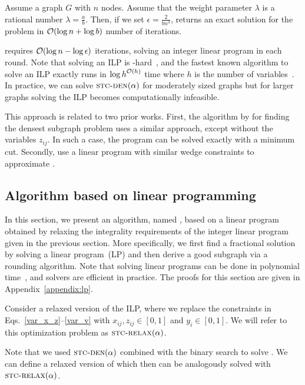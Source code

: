 \begin{proposition}
Assume a graph $G$ with $n$ nodes. Assume that the weight parameter $\lambda$ is a rational number $\lambda = \frac{a}{b}$. Then, if we set   $\epsilon = \frac{2}{bn^3}$, \algip returns an exact solution for the \prbstrwk problem in $\bigO{\log n + \log b}$ number of iterations.
\label{prop:opt-ip-exact}
\end{proposition}


\algip requires $\bigO{\log n - \log \epsilon}$ iterations, solving an integer linear program in each round. Note that solving an
ILP is \np-hard~\cite{Schrijver1998}, and the fastest known algorithm to solve an ILP exactly runs in ${\log h}^{\bigO{h}}$ time where $h$ is the number of variables~\cite{reis2023subspace}. In practice, we can solve $\textsc{stc-den}(\alpha)$ for moderately sized graphs but for larger graphs solving the ILP becomes computationally infeasible.


This approach is related to two prior works. First, the algorithm by \citet{goldberg1984finding} for finding the densest subgraph problem uses a similar approach, except without the variables $z_{ij}$. In such a case, the program can be solved exactly with a minimum cut.
Secondly, \citet{adriaens2020relaxing} use a linear program with similar wedge constraints to approximate \prbminSTC.


\subsection{Algorithm based on linear programming}\label{sec:lp}

In this section, we present an algorithm, named \alglpstc, based on a linear program obtained by relaxing the integrality requirements of the integer linear program given in the previous section. More specifically,
we first find a fractional solution by solving a linear program~(LP) and then derive a good subgraph via a rounding algorithm. Note that solving linear programs can be done in polynomial time~\citep{karmarkar1984new, van2020deterministic}, and solvers are efficient in practice. The proofs for this section are given in Appendix~\ref{appendix:lp}.

Consider a relaxed version of the ILP, where we replace the constraints in Eqs.~\ref{var_x_z}--\ref{var_v} with $x_{ij}, z_{ij} \in [0, 1]$ and $y_i \in [0, 1]$. We will refer to this optimization problem as $\textsc{stc-relax}(\alpha)$.

Note that we used $\textsc{stc-den}(\alpha)$ combined with the binary search to solve \prbstrwk. We can define a relaxed version of \prbstrwk which then can be analogously solved with $\textsc{stc-relax}(\alpha)$.

